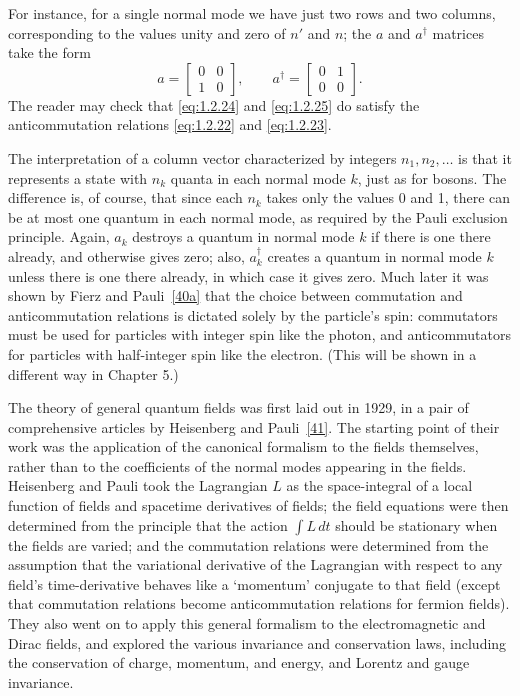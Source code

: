 For instance, for a single normal mode we have just two rows and two columns,
corresponding to the values unity and zero of $n'$ and $n$; the $a$ and
$a^{\dagger}$ matrices take the form
\[
  a=\begin{bmatrix}0&0\\1&0\end{bmatrix},
  \qquad
  a^{\dagger}=\begin{bmatrix}0&1\\0&0\end{bmatrix}.
\]
The reader may check that \eqref{eq:1.2.24} and \eqref{eq:1.2.25} do satisfy the
anticommutation relations \eqref{eq:1.2.22} and \eqref{eq:1.2.23}.

The interpretation of a column vector characterized by integers
$n_1,n_2,\ldots$ is that it represents a state with $n_k$ quanta in each
normal mode $k$, just as for bosons. The difference is, of course, that since
each $n_k$ takes only the values 0 and 1, there can be at most one quantum in
each normal mode, as required by the Pauli exclusion principle. Again, $a_k$
destroys a quantum in normal mode $k$ if there is one there already, and
otherwise gives zero; also, $a_k^{\dagger}$ creates a quantum in normal mode
$k$ unless there is one there already, in which case it gives zero. Much later
it was shown by Fierz and Pauli~\hyperref[ref:1.40a]{[40a]} that the choice between commutation and
anticommutation relations is dictated solely by the particle's spin:
commutators must be used for particles with integer spin like the photon, and
anticommutators for particles with half-integer spin like the electron. (This
will be shown in a different way in Chapter 5.)

The theory of general quantum fields was first laid out in 1929, in a pair of
comprehensive articles by Heisenberg and Pauli~\hyperref[ref:1.41]{[41]}. The starting point of
their work was the application of the canonical formalism to the fields
themselves, rather than to the coefficients of the normal modes appearing in
the fields. Heisenberg and Pauli took the Lagrangian $L$ as the space-integral
of a local function of fields and spacetime derivatives of fields; the field
equations were then determined from the principle that the action
$\int L\,dt$ should be stationary when the fields are varied; and the
commutation relations were determined from the assumption that the
variational derivative of the Lagrangian with respect to any field's
time-derivative behaves like a `momentum' conjugate to that field (except that
commutation relations become anticommutation relations for fermion fields).
They also went on to apply this general formalism to the electromagnetic and
Dirac fields, and explored the various invariance and conservation laws,
including the conservation of charge, momentum, and energy, and Lorentz and
gauge invariance.

